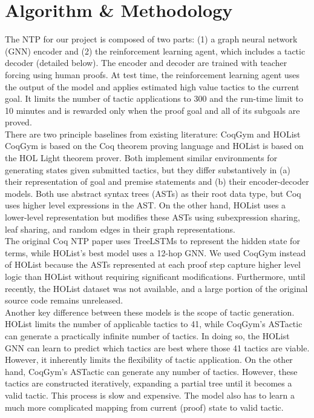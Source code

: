 \documentclass{article}
\begin{document}
   

\section{Algorithm \& Methodology}
The NTP for our project is composed of two parts: (1) a graph neural network (GNN) encoder and (2) the reinforcement learning agent, which includes a tactic decoder (detailed below). The encoder and decoder are trained with teacher forcing using human proofs. At test time, the reinforcement learning agent uses the output of the model and applies estimated high value tactics to the current goal. It limits the number of tactic applications to 300 and the run-time limit to 10 minutes and is rewarded only when the proof goal and all of its subgoals are proved. \\

There are two principle baselines from existing literature: CoqGym \cite{coqgym} and HOList \cite{hol} CoqGym is based on the Coq theorem proving language and HOList is based on the HOL Light theorem prover. Both implement similar environments for generating states given submitted tactics, but they differ substantively in (a) their representation of goal and premise statements and (b) their encoder-decoder models. Both use abstract syntax trees (ASTs) as their root data type, but Coq uses higher level expressions in the AST. On the other hand, HOList uses a lower-level representation but modifies these ASTs using subexpression sharing, leaf sharing, and random edges in their graph representations. \\

The original Coq NTP paper uses TreeLSTMs to represent the hidden state for terms, while HOList's best model uses a 12-hop GNN. We used CoqGym instead of HOList because the ASTs represented at each proof step capture higher level logic than HOList without requiring significant modifications. Furthermore, until recently, the HOList dataset was not available, and a large portion of the original source code remains unreleased. \\

Another key difference between these models is the scope of tactic generation. HOList limits the number of applicable tactics to 41, while CoqGym's ASTactic can generate a practically infinite number of tactics. In doing so, the HOList GNN can learn to predict which tactics are best where those 41 tactics are viable. However, it inherently limits the flexibility of tactic application. On the other hand, CoqGym's ASTactic can generate any number of tactics. However, these tactics are constructed iteratively, expanding a partial tree until it becomes a valid tactic. This process is slow and expensive. The model also has to learn a much more complicated mapping from current (proof) state to valid tactic.
\end{document}
